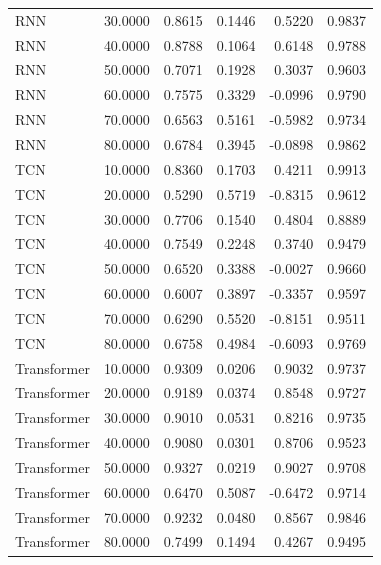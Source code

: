 \begin{tabular}{lrrrrr}
RNN & 30.0000 & 0.8615 & 0.1446 & 0.5220 & 0.9837 \\
RNN & 40.0000 & 0.8788 & 0.1064 & 0.6148 & 0.9788 \\
RNN & 50.0000 & 0.7071 & 0.1928 & 0.3037 & 0.9603 \\
RNN & 60.0000 & 0.7575 & 0.3329 & -0.0996 & 0.9790 \\
RNN & 70.0000 & 0.6563 & 0.5161 & -0.5982 & 0.9734 \\
RNN & 80.0000 & 0.6784 & 0.3945 & -0.0898 & 0.9862 \\
TCN & 10.0000 & 0.8360 & 0.1703 & 0.4211 & 0.9913 \\
TCN & 20.0000 & 0.5290 & 0.5719 & -0.8315 & 0.9612 \\
TCN & 30.0000 & 0.7706 & 0.1540 & 0.4804 & 0.8889 \\
TCN & 40.0000 & 0.7549 & 0.2248 & 0.3740 & 0.9479 \\
TCN & 50.0000 & 0.6520 & 0.3388 & -0.0027 & 0.9660 \\
TCN & 60.0000 & 0.6007 & 0.3897 & -0.3357 & 0.9597 \\
TCN & 70.0000 & 0.6290 & 0.5520 & -0.8151 & 0.9511 \\
TCN & 80.0000 & 0.6758 & 0.4984 & -0.6093 & 0.9769 \\
Transformer & 10.0000 & 0.9309 & 0.0206 & 0.9032 & 0.9737 \\
Transformer & 20.0000 & 0.9189 & 0.0374 & 0.8548 & 0.9727 \\
Transformer & 30.0000 & 0.9010 & 0.0531 & 0.8216 & 0.9735 \\
Transformer & 40.0000 & 0.9080 & 0.0301 & 0.8706 & 0.9523 \\
Transformer & 50.0000 & 0.9327 & 0.0219 & 0.9027 & 0.9708 \\
Transformer & 60.0000 & 0.6470 & 0.5087 & -0.6472 & 0.9714 \\
Transformer & 70.0000 & 0.9232 & 0.0480 & 0.8567 & 0.9846 \\
Transformer & 80.0000 & 0.7499 & 0.1494 & 0.4267 & 0.9495 \\
\bottomrule
\end{tabular}

